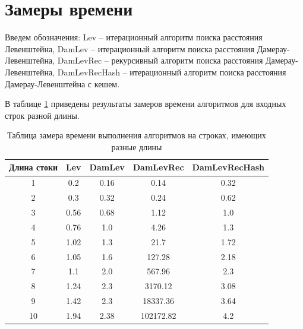 \documentclass[12pt]{report}
\begin{document}
	\section{Замеры времени}
	
	Введем обозначения: Lev -- итерационный алгоритм поиска расстояния Левенштейна, DamLev -- итерационный алгоритм поиска расстояния Дамерау-Левенштейна, DamLevRec -- рекурсивный алгоритм поиска расстояния Дамерау-Левенштейна, DamLevRecHash -- итерационный алгоритм поиска расстояния Дамерау-Левенштейна с кешем.
	
	В таблице \ref{table:t1} приведены результаты замеров времени алгоритмов для входных строк разной длины.
	
	\begin{table} [H]
		\caption{Таблица замера времени выполнения алгоритмов на строках, имеющих разные длины}
		\label{table:t1}
		\begin{center}
			\begin{tabular}{|c | c | c | c | c|}
				
				\hline
				
				Длина стоки & Lev & DamLev & DamLevRec &  DamLevRecHash \\ [0.5ex]
				
				\hline
				
				1 & 0.2 & 0.16 & 0.14 & 0.32 \\ 
				
				\hline 
				
				2 & 0.3 & 0.32 & 0.24 & 0.62 \\ 
				
				\hline 
				
				3 & 0.56 & 0.68 & 1.12 & 1.0 \\ 
				
				\hline 
				
				4 & 0.76 & 1.0 & 4.26 & 1.3 \\ 
				
				\hline 
				
				5 & 1.02 & 1.3 & 21.7 & 1.72 \\ 
				
				\hline 
				
				6 & 1.05 & 1.6 & 127.28 & 2.18 \\ 
				
				\hline 
				
				7 & 1.1 & 2.0 & 567.96 & 2.3 \\ 
				
				\hline 
				
				8 & 1.24 & 2.3 & 3170.12 & 3.08 \\ 
				
				\hline 
				
				9 & 1.42 & 2.3 & 18337.36 & 3.64\\ 
				
				\hline 
				
				10 & 1.94 & 2.38 & 102172.82 & 4.2\\ 
				
				\hline 
			\end{tabular}
		\end{center}
	\end{table}
\end{document}
